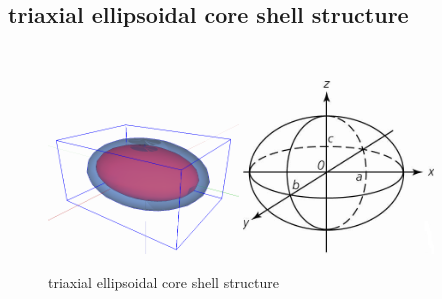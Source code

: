 \clearpage
\subsection{triaxial ellipsoidal core shell structure}
\label{sect:triaxEllShell1} ~\\

\begin{figure}[htb]
\begin{center}
\includegraphics[width=0.45\textwidth,height=0.32177\textwidth]{../images/form_factor/Ellipsoid/triaxEll.png}
\hspace{0.08\textwidth}
\includegraphics[width=0.45\textwidth,height=0.4096\textwidth]{../images/form_factor/Ellipsoid/A4ellipd.png}
\end{center}
\caption{triaxial ellipsoidal core shell structure} \label{triaEllShell}
\end{figure}


